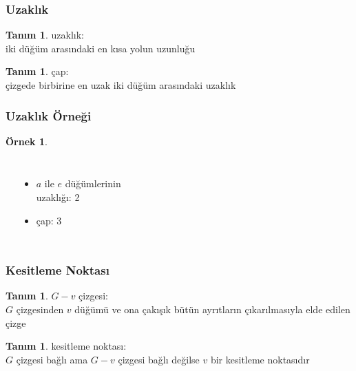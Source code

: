 \documentclass[dvipsnames]{beamer}
\theoremstyle{definition}
\newtheorem{tanim}[theorem]{Tanım}
\theoremstyle{example}
\newtheorem{ornek}[theorem]{Örnek}
\theoremstyle{plain}
\begin{document}
\begin{frame}
  \frametitle{Uzaklık}

  \begin{tanim}
    \alert{uzaklık}:\\
    iki düğüm arasındaki en kısa yolun uzunluğu
  \end{tanim}

  \pause
  \begin{tanim}
    \alert{çap}:\\
    çizgede birbirine en uzak iki düğüm arasındaki uzaklık
  \end{tanim}
\end{frame}

\begin{frame}
  \frametitle{Uzaklık Örneği}

  \begin{ornek}
    \begin{columns}
      \begin{center}
      \end{center}

      \pause
      \begin{itemize}
        \item $a$ ile $e$ düğümlerinin\\
          uzaklığı: 2
        \item çap: 3
      \end{itemize}
    \end{columns}
  \end{ornek}
\end{frame}

\begin{frame}
  \frametitle{Kesitleme Noktası}

  \begin{tanim}
    \alert{$G - v$ çizgesi}:\\
    $G$ çizgesinden $v$ düğümü ve ona çakışık bütün ayrıtların çıkarılmasıyla
    elde edilen çizge
  \end{tanim}

  \pause
  \begin{tanim}
    \alert{kesitleme noktası}:\\
    $G$ çizgesi bağlı ama $G - v$ çizgesi bağlı değilse $v$ bir kesitleme
    noktasıdır
  \end{tanim}
\end{frame}
\end{document}
